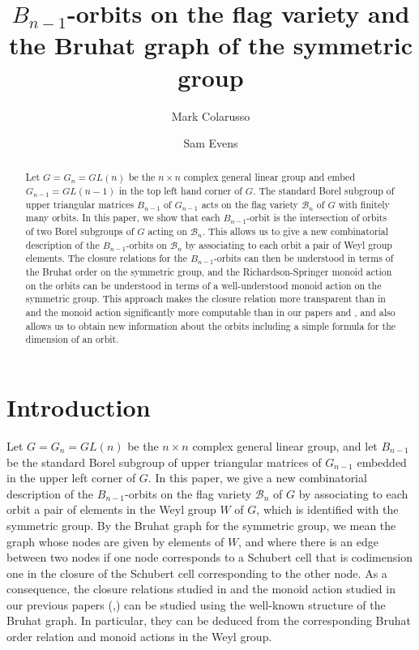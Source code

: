 \documentclass[12pt]{amsart}
\title[$B_{n-1}$-orbits and the Bruhat graph]{$B_{n-1}$-orbits on the flag variety and the Bruhat graph of the symmetric group}
\author[M. Colarusso]{Mark Colarusso}
\author[S. Evens]{Sam Evens}
\numberwithin{equation}{section}
\newcommand{\B}{\mathcal{B}}
\begin{document}
\maketitle
\begin{abstract}
Let $G=G_{n}=GL(n)$ be the $n\times n$ complex general linear group and embed $G_{n-1}=GL(n-1)$ in the top left hand corner of $G$.  The standard Borel subgroup of upper triangular matrices $B_{n-1}$ of $G_{n-1}$ acts on the flag variety $\B_{n}$ of $G$ with finitely many orbits.  In this paper, we show that each $B_{n-1}$-orbit is the intersection of orbits of two Borel subgroups of $G$ acting on $\B_{n}$.  This allows us to give a new combinatorial description of the $B_{n-1}$-orbits on $\B_{n}$ by associating to each orbit a pair of Weyl group elements.  The closure relations for the $B_{n-1}$-orbits can then be understood in terms of  the Bruhat order on the symmetric group, and the Richardson-Springer monoid action on the orbits can be understood in terms of a well-understood monoid action on the symmetric group.  This approach makes the closure relation more transparent than in \cite{Magyar} and the monoid action significantly more computable than in our papers \cite{CE21I} and \cite{CE21II}, and also allows us to obtain new information about the orbits including a simple formula for the dimension of an orbit.
\end{abstract}

\section{Introduction}

Let $G=G_{n}=GL(n)$ be the $n\times n$ complex general linear group, and let $B_{n-1}$ be the standard Borel subgroup of upper triangular matrices of 
$G_{n-1}$ embedded in the upper left corner of $G$.  In this paper, we give a new combinatorial description of the
$B_{n-1}$-orbits on the flag variety $\B_{n}$ of $G$ by associating to each orbit a pair of elements 
in the Weyl group $W$ of $G$, which  is identified with the symmetric group.   By the Bruhat graph for the symmetric group, we mean the graph whose nodes are given by elements of $W$, and where there is an edge between two nodes if one node corresponds to a Schubert cell that is codimension one in the closure of the Schubert cell corresponding to the other node.  As a consequence, the closure relations studied in \cite{Magyar} and the monoid action studied in our previous papers (\cite{CE21I},\cite{CE21II}) can be studied using the well-known structure of the Bruhat graph.   In particular, they can be deduced from the corresponding Bruhat order relation and monoid actions in the Weyl group.
\end{document}
